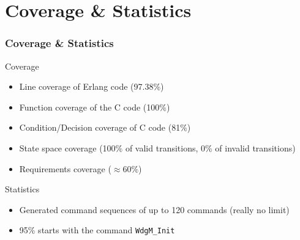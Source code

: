 \documentclass{beamer}
\begin{document}

\section{Coverage \& Statistics}

\begin{frame}[fragile]
  \frametitle{Coverage \& Statistics}
  \begin{block}{Coverage}
    \begin{itemize}
      \item Line coverage of Erlang code (97.38\%)
      \item Function coverage of the C code (100\%)
      \item Condition/Decision coverage of C code (81\%)
      \item State space coverage (100\% of valid transitions, 0\% of
        invalid transitions)
      \item Requirements coverage ($\approx 60\%$)
    \end{itemize}
  \end{block}
  \begin{block}{Statistics}
    \begin{itemize}
      \item Generated command sequences of up to 120 commands (really no limit)
      \item 95\% starts with the command \verb!WdgM_Init!
    \end{itemize}
  \end{block}
\end{frame}

\end{document}
